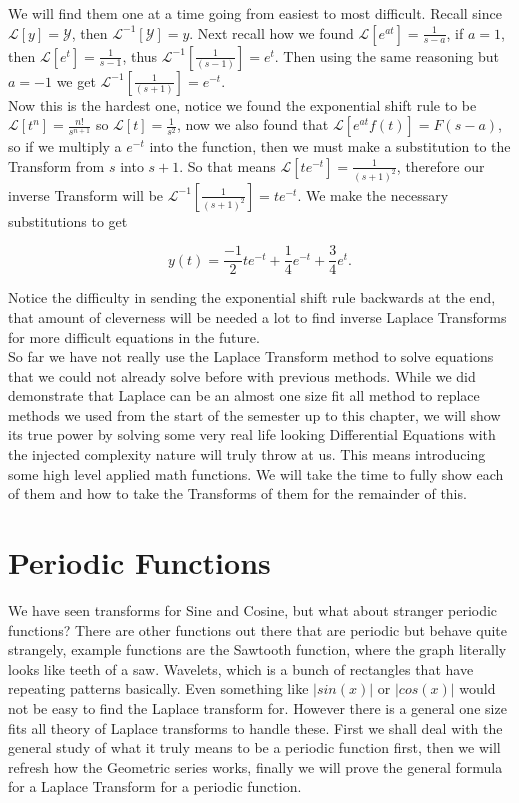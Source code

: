 \documentclass[12pt]{article}
\newcommand{\lp}{\mathscr{L}}
\newcommand{\hugey}{\mathscr{Y}}
\begin{document}
We will find them one at a time going from easiest to most difficult. Recall since $\lp [y]=\hugey$, then $\lp^{-1}[\hugey]=y$. Next recall how we found $\lp [e^{at}]=\frac{1}{s-a}$, if $a=1$, then $\lp [e^t]=\frac{1}{s-1}$, thus $\lp^{-1}\left[\frac{1}{(s-1)}\right]=e^t$. Then using the same reasoning but $a=-1$ we get $\lp^{-1}\left[\frac{1}{(s+1)}\right]=e^{-t}$. \\

Now this is the hardest one, notice we found the exponential shift rule to be $\lp [t^n]=\frac{n!}{s^{n+1}}$ so $\lp [t]=\frac{1}{s^2}$, now we also found that $\lp [e^{at}f(t)]=F(s-a)$, so if we multiply a $e^{-t}$ into the function, then we must make a substitution to the Transform from $s$ into $s+1$. So that means $\lp [te^{-t}]=\frac{1}{(s+1)^2}$, therefore our inverse Transform will be $\lp^{-1}\left[\frac{1}{(s+1)^2}\right]=te^{-t}$. We make the necessary substitutions to get

\begin{equation*}
    y(t) = \frac{-1}{2}te^{-t}+\frac{1}{4}e^{-t}+\frac{3}{4}e^t.
\end{equation*}

Notice the difficulty in sending the exponential shift rule backwards at the end, that amount of cleverness will be needed a lot to find inverse Laplace Transforms for more difficult equations in the future. \\

So far we have not really use the Laplace Transform method to solve equations that we could not already solve before with previous methods. While we did demonstrate that Laplace can be an almost one size fit all method to replace methods we used from the start of the semester up to this chapter, we will show its true power by solving some very real life looking Differential Equations with the injected complexity nature will truly throw at us. This means introducing some high level applied math functions. We will take the time to fully show each of them and how to take the Transforms of them for the remainder of this.

\section{Periodic Functions}

We have seen transforms for Sine and Cosine, but what about stranger periodic functions? There are other functions out there that are periodic but behave quite strangely, example functions are the Sawtooth function, where the graph literally looks like teeth of a saw. Wavelets, which is a bunch of rectangles that have repeating patterns basically. Even something like $|sin(x)|$ or $|cos(x)|$ would not be easy to find the Laplace transform for. However there is a general one size fits all theory of Laplace transforms to handle these. First we shall deal with the general study of what it truly means to be a periodic function first, then we will refresh how the Geometric series works, finally we will prove the general formula for a Laplace Transform for a periodic function.
\end{document}
